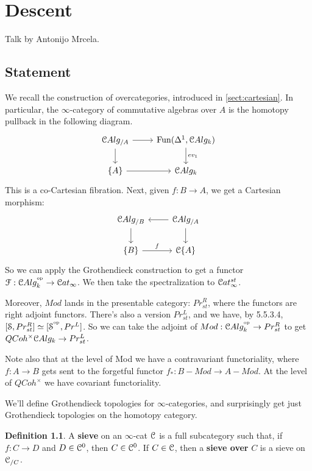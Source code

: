 \documentclass[10pt,a4paper,reqno,oneside]{book} %
\theoremstyle{plain}
\theoremstyle{definition}
\newtheorem{defin}[thm]{Definition}
\theoremstyle{remark}
\numberwithin{equation}{section}
\begin{document}
\chapter{Descent}
Talk by Antonijo Mrcela.

\section{Statement}
\label{sect:cc_statement}

We recall the construction of overcategories, introduced in \ref{sect:cartesian}. In particular, the $\infty$-category of
commutative algebras over $A$ is the homotopy pullback in the following diagram.
\[
\begin{tikzcd}
\cC Alg_{/A} \arrow{r}\arrow{d} & \Fun(\Delta^1 , \cC Alg_k)\arrow{d}{ev_1} \\
\{A\} \arrow{r} & \cC Alg_k
\end{tikzcd}
\]
This is a co-Cartesian fibration. Next, given $f:B \to A$, we get a Cartesian morphism:
\[
\begin{tikzcd}
\cC Alg_{/B} \arrow{d} &  \cC Alg_{/A} \arrow{d}\arrow{l}\\
\{B\} \arrow{r}{f} & \cC \{A\}
\end{tikzcd}
\]
So we can apply the Grothendieck construction to get a functor $\mathcal{F} : \mathcal C Alg_k^{^\mathrm{op}}
\to \mathcal C at_{\infty}$. We then take the spectralization to $\mathcal C at_{\infty}^{st}$.

Moreover, $Mod$ lands in the presentable category: $Pr_{st}^R$, where the functors are right adjoint functors. There's also a version
$Pr_{st}^L$, and we have, by \cite{HTT} 5.5.3.4, $[\mathcal S, Pr_{st}^R] \simeq [\mathcal S^{^\mathrm{op}}, Pr^L]$. So we can take the adjoint of
$Mod: \mathcal C Alg_k^{^\mathrm{op}} \to Pr_{st}^R$ to get $QCoh^{\times} \mathcal C Alg_k \to Pr_{st}^L$.

Note also that at the level of Mod we have a contravariant functoriality, where $f: A \to B$ gets sent to the forgetful functor
$f_* : B-Mod \to A-Mod$. At the level of $QCoh^{\times}$ we have covariant functoriality.

We'll define Grothendieck topologies for $\infty$-categories, and surprisingly get just Grothendieck topologies on the homotopy
category.

\begin{defin}
A \textbf{sieve} on an $\infty$-cat $\mathcal C$ is a full subcategory such that, if $f: C \to D$ and $D \in \mathcal C^0$, then
$C \in \mathcal C^0$. If $C \in \mathcal C$, then a \textbf{sieve over} $C$ is a sieve on $\mathcal C_{/C}$.
\end{defin}
\end{document}
